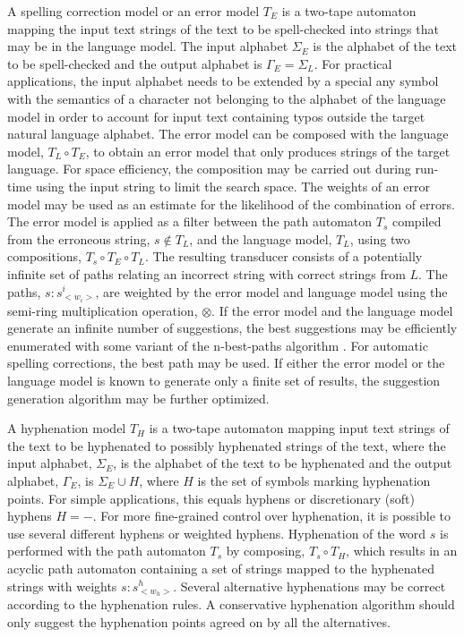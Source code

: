 \documentclass[a4paper,conference]{IEEEtran}
\begin{document}
A spelling correction model or an error model $T_E$ is a two-tape
automaton mapping the input text strings of the text to be
spell-checked into strings that may be in the language model. The
input alphabet $\Sigma_E$ is the alphabet of the text to be
spell-checked and the output alphabet is $\Gamma_E = \Sigma_L$. For
practical applications, the input alphabet needs to be extended by a
special any symbol with the semantics of a character not belonging to
the alphabet of the language model in order to account for input text
containing typos outside the target natural language alphabet. The
error model can be composed with the language model, $T_L \circ T_E$,
to obtain an error model that only produces strings of the target
language. For space efficiency, the composition may be carried out
during run-time using the input string to limit the search space. The
weights of an error model may be used as an estimate for the likelihood of the
combination of errors. The error model is applied as a filter between
the path automaton $T_s$ compiled from the erroneous string, $s \notin
T_L$, and the language model, $T_L$, using two compositions, $T_s
\circ T_E \circ T_L$. The resulting transducer consists of a
potentially infinite set of paths relating an incorrect string with
correct strings from $L$. The paths, $s:s^i_{<w_i>}$, are weighted by
the error model and language model using the semi-ring multiplication
operation, $\otimes$. If the error model and the language model
generate an infinite number of suggestions, the best suggestions may
be efficiently enumerated with some variant of the n-best-paths
algorithm \cite{mohri/2002}. For automatic spelling corrections, the
best path may be used. If either the error model or the language model
is known to generate only a finite set of results, the suggestion
generation algorithm may be further optimized.

A hyphenation model $T_H$ is a two-tape automaton mapping input text
strings of the text to be hyphenated to possibly hyphenated strings of
the text, where the input alphabet, $\Sigma_E$, is the alphabet of the
text to be hyphenated and the output alphabet, $\Gamma_E$, is
$\Sigma_E \cup H$, where $H$ is the set of symbols marking hyphenation
points. For simple applications, this equals hyphens or discretionary
(soft) hyphens $H = {-}$. For more fine-grained control over
hyphenation, it is possible to use several different hyphens or
weighted hyphens.  Hyphenation of the word $s$ is performed with the
path automaton $T_s$ by composing, $T_s \circ T_H$, which results in
an acyclic path automaton containing a set of strings mapped to the
hyphenated strings with weights $s:s^h_{<w_h>}$. Several alternative hyphenations
may be correct according to the hyphenation rules. A conservative hyphenation algorithm
should only suggest the hyphenation points agreed on by all the alternatives.
\end{document}
